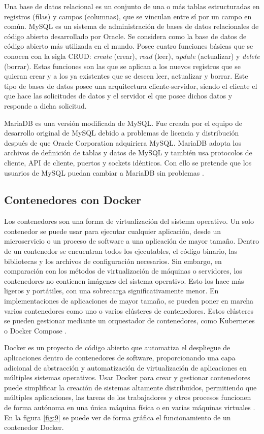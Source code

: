 Una base de datos relacional es un conjunto de una o más tablas estructuradas en registros (filas) y campos (columnas), que se vinculan entre sí por un campo en común. MySQL es un sistema de administración de bases de datos relacionales de código abierto desarrollado por Oracle. Se considera como la base de datos de código abierto más utilizada en el mundo. Posee cuatro funciones básicas que se conocen con la sigla CRUD: \textit{create} (crear), \textit{read} (leer), \textit{update} (actualizar) y \textit{delete} (borrar). Estas funciones son las que se aplican a los nuevos registros que se quieran crear y a los ya existentes que se deseen leer, actualizar y borrar. Este tipo de bases de datos posee una arquitectura cliente-servidor, siendo el cliente el que hace las solicitudes de datos y el servidor el que posee dichos datos y responde a dicha solicitud.

MariaDB es una versión modificada de MySQL. Fue creada por el equipo de desarrollo original de MySQL debido a problemas de licencia y distribución después de que Oracle Corporation adquiriera MySQL. MariaDB adopta los archivos de definición de tablas y datos de MySQL y también usa protocolos de cliente, API de cliente, puertos y sockets idénticos. Con ello se pretende que los usuarios de MySQL puedan cambiar a MariaDB sin problemas \citep{18}.

\subsection{Contenedores con Docker}

Los contenedores son una forma de virtualización del sistema operativo. Un solo contenedor se puede usar para ejecutar cualquier aplicación, desde un microservicio o un proceso de software a una aplicación de mayor tamaño. Dentro de un contenedor se encuentran todos los ejecutables, el código binario, las bibliotecas y los archivos de configuración necesarios. Sin embargo, en comparación con los métodos de virtualización de máquinas o servidores, los contenedores no contienen imágenes del sistema operativo. Esto los hace más ligeros y portátiles, con una sobrecarga significativamente menor. En implementaciones de aplicaciones de mayor tamaño, se pueden poner en marcha varios contenedores como uno o varios clústeres de contenedores. Estos clústeres se pueden gestionar mediante un orquestador de contenedores, como Kubernetes o Docker Compose \citep{19}.

Docker es un proyecto de código abierto que automatiza el despliegue de aplicaciones dentro de contenedores de software, proporcionando una capa adicional de abstracción y automatización de virtualización de aplicaciones en múltiples sistemas operativos. Usar Docker para crear y gestionar contenedores puede simplificar la creación de sistemas altamente distribuidos, permitiendo que múltiples aplicaciones, las tareas de los trabajadores y otros procesos funcionen de forma autónoma en una única máquina física o en varias máquinas virtuales \citep{20}. En la figura \ref{fig:9} se puede ver de forma gráfica el funcionamiento de un contenedor Docker.

